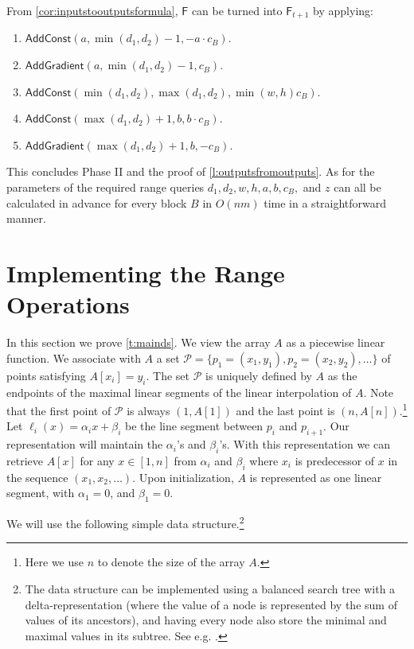 \documentclass[a4paper,UKenglish,cleveref, autoref, thm-restate]{lipics-v2021}
\newcommand{\F}{\mathsf{F}}
\newcommand{\AC}{\mathsf{AddConst}}
\newcommand{\AG}{\mathsf{AddGradient}}
\renewcommand{\P}{\mathcal{P}}
\begin{document}
\noindent From \cref{cor:inputstooutputsformula}, $\F$ can be turned into $\F_{t+1}$ by applying: 
\begin{enumerate}
    \item $\AC(a, \min(d_1,d_2) - 1, -a \cdot c_B)$.
    \item $\AG(a, \min(d_1,d_2) - 1, c_B)$.
    \item $\AC(\min(d_1,d_2),\max(d_1,d_2),\min(w,h)c_B)$.
    \item $\AC(\max(d_1,d_2) +1, b, b \cdot c_B)$.
    \item $\AG(\max(d_1,d_2) + 1, b , -c_B)$.
\end{enumerate}

This concludes Phase II and the proof of \cref{l:outputsfromoutputs}. 
As for the parameters of the required range queries $d_1,d_2,w,h,a,b,c_B,$ and $z$ can all be calculated in advance for every block $B$ in $O(nm)$ time in a straightforward manner.

\section{Implementing the Range Operations}\label{sec:IntervalDS}

In this section we prove \cref{t:mainds}.
We view the array $A$ as a piecewise linear function. 
We associate with $A$ a set $\P = \{p_1 = (x_1,y_1) ,p_2 = (x_2,y_2), \ldots\}$ of points satisfying $A[x_i]=y_i$. The set $\P$ is uniquely defined by $A$ as the endpoints of the maximal linear segments of the linear interpolation of $A$. Note that the first point of $\P$ is always $(1,A[1])$ and the last point is $(n,A[n])$.\footnote{Here we use $n$ to denote the size of the array $A$.} 
Let $\ell_i(x)=\alpha_ix+\beta_i$ be the line segment between $p_i$ and $p_{i+1}$. 
Our representation will maintain the $\alpha_i$'s and $\beta_i$'s.
With this representation we can retrieve $A[x]$ for any $x\in[1,n]$ from $\alpha_i$ and $\beta_i$ where $x_i$ is predecessor of $x$ in the sequence $(x_1, x_2, \ldots)$.
Upon initialization, $A$ is represented as one linear segment, with $\alpha_1 =0$, and $\beta_1=0$.

We will use the following simple data structure.\footnote{The data structure can be implemented using a balanced search tree with a delta-representation (where the value of a node is represented by the sum of values of its ancestors), and having every node also store the minimal and maximal values in its subtree. See e.g. \cite{PlanarBook}.}
\end{document}
